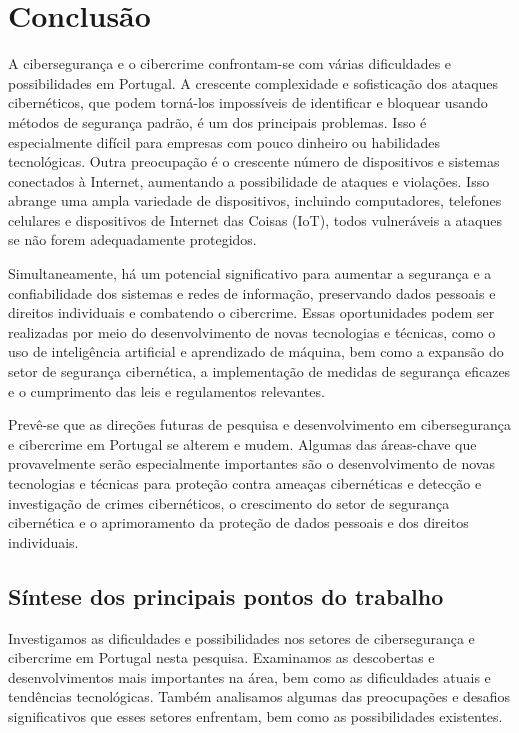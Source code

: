 \chapter{Conclusão}

A cibersegurança e o cibercrime confrontam-se com várias dificuldades e possibilidades em Portugal. A crescente complexidade e sofisticação dos ataques cibernéticos, que podem torná-los impossíveis de identificar e bloquear usando métodos de segurança padrão, é um dos principais problemas. Isso é especialmente difícil para empresas com pouco dinheiro ou habilidades tecnológicas. Outra preocupação é o crescente número de dispositivos e sistemas conectados à Internet, aumentando a possibilidade de ataques e violações. Isso abrange uma ampla variedade de dispositivos, incluindo computadores, telefones celulares e dispositivos de Internet das Coisas (IoT), todos vulneráveis a ataques se não forem adequadamente protegidos.

Simultaneamente, há um potencial significativo para aumentar a segurança e a confiabilidade dos sistemas e redes de informação, preservando dados pessoais e direitos individuais e combatendo o cibercrime. Essas oportunidades podem ser realizadas por meio do desenvolvimento de novas tecnologias e técnicas, como o uso de inteligência artificial e aprendizado de máquina, bem como a expansão do setor de segurança cibernética, a implementação de medidas de segurança eficazes e o cumprimento das leis e regulamentos relevantes.

Prevê-se que as direções futuras de pesquisa e desenvolvimento em cibersegurança e cibercrime em Portugal se alterem e mudem. Algumas das áreas-chave que provavelmente serão especialmente importantes são o desenvolvimento de novas tecnologias e técnicas para proteção contra ameaças cibernéticas e detecção e investigação de crimes cibernéticos, o crescimento do setor de segurança cibernética e o aprimoramento da proteção de dados pessoais e dos direitos individuais.

\section{Síntese dos principais pontos do trabalho}

Investigamos as dificuldades e possibilidades nos setores de cibersegurança e cibercrime em Portugal nesta pesquisa. Examinamos as descobertas e desenvolvimentos mais importantes na área, bem como as dificuldades atuais e tendências tecnológicas. Também analisamos algumas das preocupações e desafios significativos que esses setores enfrentam, bem como as possibilidades existentes.

